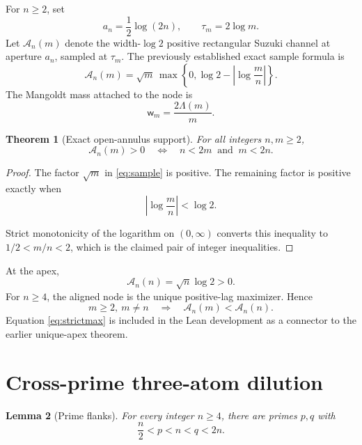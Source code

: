 \documentclass[11pt]{article}
\newtheorem{theorem}{Theorem}[section]
\newtheorem{lemma}[theorem]{Lemma}
\newcommand{\Lam}{\Lambda}
\newcommand{\A}{\mathcal A}
\newcommand{\w}{\mathsf w}
\begin{document}
For $n\ge2$, set
\[
 a_n=\frac12\log(2n),\qquad \tau_m=2\log m.
\]
Let $\A_n(m)$ denote the width-$\log 2$ positive rectangular Suzuki channel at aperture $a_n$,
sampled at $\tau_m$.  The previously established exact sample formula is
\begin{equation}\label{eq:sample}
 \A_n(m)=\sqrt m\,
 \max\!\left\{0,\log 2-\left|\log\frac mn\right|\right\}.
\end{equation}
The Mangoldt mass attached to the node is
\begin{equation}\label{eq:mass}
 \w_m=\frac{2\Lam(m)}m.
\end{equation}

\begin{theorem}[Exact open-annulus support]\label{thm:support}
For all integers $n,m\ge2$,
\[
 \A_n(m)>0
 \quad\Longleftrightarrow\quad
 n<2m\ \text{ and }\ m<2n.
\]
\end{theorem}

\begin{proof}
The factor $\sqrt m$ in \eqref{eq:sample} is positive.  The remaining factor is positive exactly
when
\[
 \left|\log\frac mn\right|<\log2.
\]\leavevmode\par
Strict monotonicity of the logarithm on $(0,\infty)$ converts this inequality to
$1/2<m/n<2$, which is the claimed pair of integer inequalities.
\end{proof}

At the apex,
\begin{equation}\label{eq:self}
 \A_n(n)=\sqrt n\log2>0.
\end{equation}
For $n\ge4$, the aligned node is the unique positive-lag maximizer.  Hence
\begin{equation}\label{eq:strictmax}
 m\ge2,\ m\ne n \quad\Longrightarrow\quad \A_n(m)<\A_n(n).
\end{equation}
Equation \eqref{eq:strictmax} is included in the Lean development as a connector to the earlier
unique-apex theorem.

\section{Cross-prime three-atom dilution}\leavevmode\par

\begin{lemma}[Prime flanks]\label{lem:flanks}
For every integer $n\ge4$, there are primes $p,q$ with
\[
 \frac n2<p<n<q<2n.
\]
\end{lemma}
\end{document}
